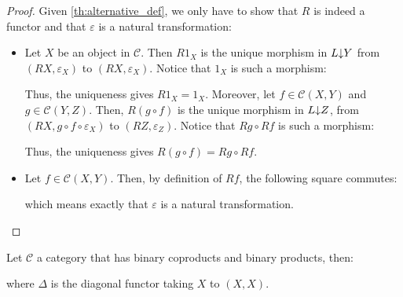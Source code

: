 \begin{proof} Given \ref{th:alternative_def}, we only have to show that $R$ is indeed a functor and that $\varepsilon$ is a natural transformation:
\begin{itemize}
\item Let $X$ be an object in $\mathcal{C}$. Then $R1_X$ is the unique morphism in $L\mkern-5mu\downarrow\mkern-5mu Y$ from $(RX,\varepsilon_X)$ to $(RX,\varepsilon_X)$. Notice that $1_X$ is such a morphism:
\begin{center}
\end{center}
Thus, the uniqueness gives $R1_X=1_X$. Moreover, let $f\in\mathcal{C}(X,Y)$ and $g\in\mathcal{C}(Y,Z)$. Then, $R(g\circ f)$ is the unique morphism in $L\mkern-5mu\downarrow\mkern-5mu Z$, from $(RX,g\circ f\circ\varepsilon_X)$ to $(RZ,\varepsilon_Z)$. Notice that $Rg\circ Rf$ is such a morphism:
\begin{center}
\end{center}
Thus, the uniqueness gives $R(g\circ f)=Rg\circ Rf$.
\item Let $f\in\mathcal{C}(X,Y)$. Then, by definition of $Rf$, the following square commutes:
\begin{center}
\end{center}
which means exactly that $\varepsilon$ is a natural transformation.\qedhere
\end{itemize}
\end{proof}
\begin{example} Let $\mathcal{C}$ a category that has binary coproducts and binary products, then:
\begin{center}
\end{center}
where $\Delta$ is the diagonal functor taking $X$ to $(X,X)$.
\end{example}
